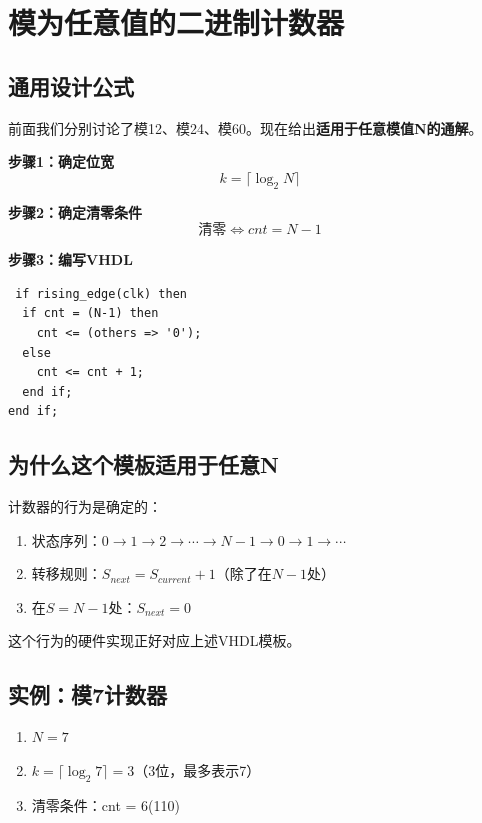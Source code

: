 \chapter{模为任意值的二进制计数器}

\section{通用设计公式}

前面我们分别讨论了模12、模24、模60。现在给出\textbf{适用于任意模值N的通解}。

\begin{designflow}[模N计数器通用设计]
\textbf{步骤1：确定位宽}
$$k = \lceil \log_2 N \rceil$$

\textbf{步骤2：确定清零条件}
$$\text{清零} \iff cnt = N-1$$

\textbf{步骤3：编写VHDL}
\end{designflow}

\begin{lstlisting}
 if rising_edge(clk) then
  if cnt = (N-1) then
    cnt <= (others => '0');
  else
    cnt <= cnt + 1;
  end if;
end if;
\end{lstlisting}

\section{为什么这个模板适用于任意N}

计数器的行为是确定的：
\begin{enumerate}
  \item 状态序列：$0 \to 1 \to 2 \to \cdots \to N-1 \to 0 \to 1 \to \cdots$
  \item 转移规则：$S_{next} = S_{current} + 1$（除了在$N-1$处）
  \item 在$S = N-1$处：$S_{next} = 0$
\end{enumerate}

这个行为的硬件实现正好对应上述VHDL模板。

\section{实例：模7计数器}

\begin{enumerate}
  \item $N = 7$
  \item $k = \lceil \log_2 7 \rceil = 3$（3位，最多表示7）
  \item 清零条件：cnt = 6(110)
\end{enumerate}

